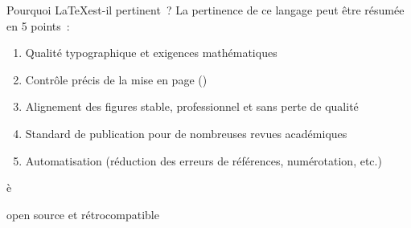 \begin{frame}{Pourquoi \LaTeX\;est-il pertinent~?}
    La pertinence de ce langage peut être résumée en 5 points~:
    \vfill
    \begin{enumerate}
        \item Qualité typographique et exigences mathématiques
        \item Contrôle précis de la mise en page ()
        \item Alignement des figures stable, professionnel et sans
        perte de qualité
        \item Standard de publication pour de nombreuses revues académiques
        \item Automatisation (réduction des erreurs de références, numérotation, etc.)
    \end{enumerate}è
    \vfill
    \centering
    \begin{mylittlegreenbox}
        \Large\PointingHand\;open source et rétrocompatible
    \end{mylittlegreenbox}
\end{frame}
